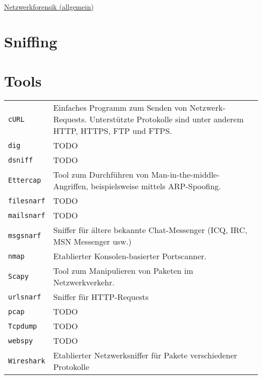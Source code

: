\raggedright
\footnotesize
\begin{multicols}{3}	
	\setlength{\premulticols}{1pt}
	\setlength{\postmulticols}{1pt}
	\setlength{\multicolsep}{1pt}
	\setlength{\columnsep}{2pt}

\begin{center}
     \Large{\underline{Netzwerkforensik (allgemein)}} \\
\end{center}

\section{Sniffing}
\section{Tools}
\begin{tabular}{@{}p{\the\MyLen}
		@{}p{\linewidth-\the\MyLen}@{}}
	\texttt{cURL} & Einfaches Programm zum Senden von Netzwerk-Requests. Unterstützte Protokolle sind unter anderem HTTP, HTTPS, FTP und FTPS.\\
	\texttt{dig} & TODO\\
	\texttt{dsniff} & TODO\\
	\texttt{Ettercap} & Tool zum Durchführen von Man-in-the-middle-Angriffen, beispielsweise mittels ARP-Spoofing.\\
	\texttt{filesnarf} & TODO\\
	\texttt{mailsnarf} & TODO\\
	\texttt{msgsnarf} & Sniffer für ältere bekannte Chat-Messenger (ICQ, IRC, MSN Messenger usw.)\\
	\texttt{nmap} & Etablierter Konsolen-basierter Portscanner.\\
	\texttt{Scapy} & Tool zum Manipulieren von Paketen im Netzwerkverkehr.\\
	\texttt{urlsnarf} & Sniffer für HTTP-Requests\\
	\texttt{pcap} & TODO\\
	\texttt{Tcpdump} & TODO\\
	\texttt{webspy} & TODO\\
	\texttt{Wireshark} & Etablierter Netzwerksniffer für Pakete verschiedener Protokolle\\
\end{tabular}
\lipsum
\end{multicols}